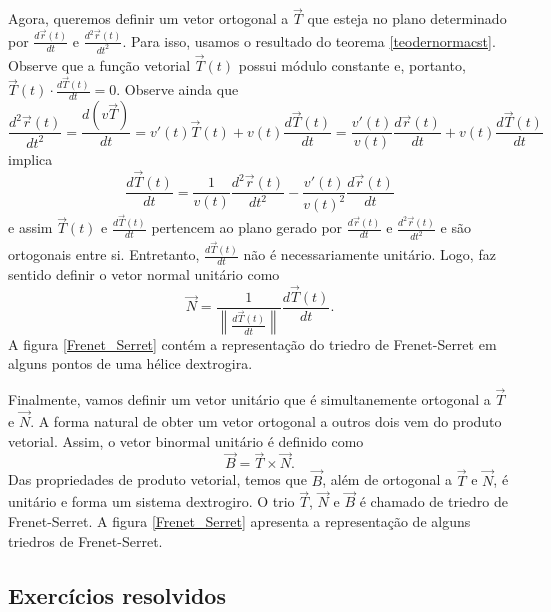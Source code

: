 Agora, queremos definir um vetor ortogonal a $\vec{T}$ que esteja no plano determinado por $\frac{d\vec{r}(t)}{dt}$ e $\frac{d^2\vec{r}(t)}{dt^2}$. Para isso, usamos o resultado do teorema \ref{teodernormacst}. Observe que a função vetorial $\vec{T}(t)$ possui módulo constante e, portanto, $\vec{T}(t)\cdot \frac{d\vec{T}(t)}{dt}=0$. Observe ainda que
$$
\frac{d^2\vec{r}(t)}{dt^2}=\frac{d (v \vec{T} )}{dt} = v'(t) \vec{T}(t) + v(t) \frac{d \vec{T}(t)}{dt} = \frac{v'(t)}{v(t)} \frac{d\vec{r}(t)}{dt}+ v(t) \frac{d\vec{T}(t)}{dt}
$$
implica
$$ \frac{d\vec{T}(t)}{dt} = \frac{1}{v(t)} \frac{d^2 \vec{r}(t)}{dt^2} - \frac{v'(t)}{v(t)^2} \frac{d \vec{r}(t)}{dt}
$$
e assim
$\vec{T}(t)$ e $\frac{d\vec{T}(t)}{dt}$ pertencem ao plano gerado por $\frac{d\vec{r}(t)}{dt} $ e $\frac{d^2\vec{r}(t)}{dt^2}$ e são ortogonais entre si. Entretanto, $\frac{d\vec{T}(t)}{dt}$ não é necessariamente unitário. Logo, faz sentido definir o vetor normal unitário como
$$
\vec{N}=\frac{1}{\left\|\frac{d\vec{T}(t)}{dt}\right\|} \frac{d \vec{T}(t)}{dt}.
$$
A figura \ref{Frenet_Serret} contém a representação do triedro de Frenet-Serret em alguns pontos de uma hélice dextrogira.

Finalmente, vamos definir um vetor unitário que é simultanemente ortogonal a $\vec{T}$ e $\vec{N}$. A forma natural de obter um vetor ortogonal a outros dois vem do produto vetorial. Assim, o vetor binormal unitário é definido como
$$
\vec{B}=\vec{T}\times\vec{N}.
$$
Das propriedades de produto vetorial, temos que $\vec{B}$, além de ortogonal a $\vec{T}$ e $\vec{N}$, é unitário e forma um sistema dextrogiro. O trio $\vec{T}$, $\vec{N}$ e $\vec{B}$ é chamado de triedro de Frenet-Serret. A figura \ref{Frenet_Serret} apresenta a representação de alguns triedros de Frenet-Serret.


\subsection*{Exercícios resolvidos} %

